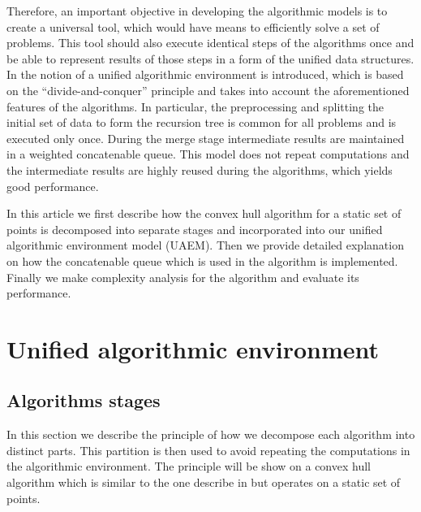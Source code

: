 \documentclass[a4paper,UKenglish,cleveref, autoref]{socg-lipics-v2019}
\begin{document}
	Therefore, an important objective in developing the algorithmic models is to create a universal tool, which would have means to efficiently solve a set of problems. This tool should also execute identical steps of the algorithms once and be able to represent results of those steps in a form of the unified data structures. In \cite{tereshchenko} the notion of a unified algorithmic environment is introduced, which is based on the ``divide-and-conquer'' principle and takes into account the aforementioned features of the algorithms. In particular, the preprocessing and splitting the initial set of data to form the recursion tree is common for all problems and is executed only once. During the merge stage intermediate results are maintained in a weighted concatenable queue. This model does not repeat computations and the intermediate results are highly reused during the algorithms, which yields good performance.
	
	In this article we first describe how the convex hull algorithm for a static set of points is decomposed into separate stages and incorporated into our unified algorithmic environment model (UAEM). Then we provide detailed explanation on how the concatenable queue which is used in the algorithm is implemented. Finally we make complexity analysis for the algorithm and evaluate its performance.


\section{Unified algorithmic environment}
\label{sec:unified-algorithmic-environment}
\subsection{Algorithms stages}


	
	
	In this section we describe the principle of how we decompose each algorithm into distinct parts. This partition is then used to avoid repeating the computations in the algorithmic environment. The principle will be show on a convex hull algorithm which is similar to the one describe in \cite{overmars} but operates on a static set of points.
	
\end{document}
